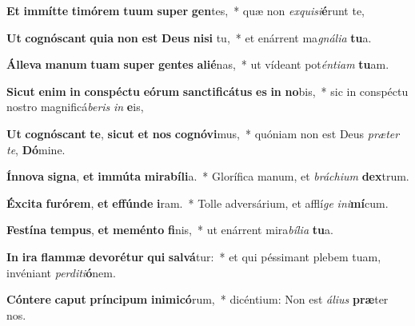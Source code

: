 \item \textbf{Et} \textbf{im}\textbf{mít}\textbf{te} \textbf{ti}\textbf{mó}\textbf{rem} \textbf{tu}\textbf{um} \textbf{su}\textbf{per} \textbf{gen}tes,~* quæ non \textit{ex}\textit{qui}\textit{si}\textbf{é}runt te,
\item \textbf{Ut} \textbf{co}\textbf{gnós}\textbf{cant} \textbf{qui}\textbf{a} \textbf{non} \textbf{est} \textbf{De}\textbf{us} \textbf{ni}\textbf{si} tu,~* et enárrent ma\textit{gná}\textit{li}\textit{a} \textbf{tu}a.
\item \textbf{Ál}\textbf{le}\textbf{va} \textbf{ma}\textbf{num} \textbf{tu}\textbf{am} \textbf{su}\textbf{per} \textbf{gen}\textbf{tes} \textbf{a}\textbf{li}\textbf{é}nas,~* ut vídeant pot\textit{én}\textit{ti}\textit{am} \textbf{tu}am.
\item \textbf{Sic}\textbf{ut} \textbf{e}\textbf{nim} \textbf{in} \textbf{con}\textbf{spéc}\textbf{tu} \textbf{e}\textbf{ó}\textbf{rum} \textbf{sanc}\textbf{ti}\textbf{fi}\textbf{cá}\textbf{tus} \textbf{es} \textbf{in} \textbf{no}bis,~* sic in conspéctu nostro magnificá\textit{be}\textit{ris} \textit{in} \textbf{e}is,
\item \textbf{Ut} \textbf{co}\textbf{gnós}\textbf{cant} \textbf{te}, \textbf{sic}\textbf{ut} \textbf{et} \textbf{nos} \textbf{co}\textbf{gnó}\textbf{vi}mus,~* quóniam non est Deus \textit{præ}\textit{ter} \textit{te}, \textbf{Dó}mine.
\item \textbf{Ín}\textbf{no}\textbf{va} \textbf{si}\textbf{gna}, \textbf{et} \textbf{im}\textbf{mú}\textbf{ta} \textbf{mi}\textbf{ra}\textbf{bí}\textbf{li}a.~* Glorífica manum, et \textit{brá}\textit{chi}\textit{um} \textbf{dex}trum.
\item \textbf{Éx}\textbf{ci}\textbf{ta} \textbf{fu}\textbf{ró}\textbf{rem}, \textbf{et} \textbf{ef}\textbf{fún}\textbf{de} \textbf{i}ram.~* Tolle adversárium, et afflí\textit{ge} \textit{in}\textit{i}\textbf{mí}cum.
\item \textbf{Fes}\textbf{tí}\textbf{na} \textbf{tem}\textbf{pus}, \textbf{et} \textbf{me}\textbf{mén}\textbf{to} \textbf{fi}nis,~* ut enárrent mira\textit{bí}\textit{li}\textit{a} \textbf{tu}a.
\item \textbf{In} \textbf{i}\textbf{ra} \textbf{flam}\textbf{mæ} \textbf{de}\textbf{vo}\textbf{ré}\textbf{tur} \textbf{qui} \textbf{sal}\textbf{vá}tur:~* et qui péssimant plebem tuam, invéniant \textit{per}\textit{di}\textit{ti}\textbf{ó}nem.
\item \textbf{Cón}\textbf{te}\textbf{re} \textbf{ca}\textbf{put} \textbf{prín}\textbf{ci}\textbf{pum} \textbf{in}\textbf{i}\textbf{mi}\textbf{có}rum,~* dicéntium: Non est \textit{á}\textit{li}\textit{us} \textbf{præ}ter nos.

